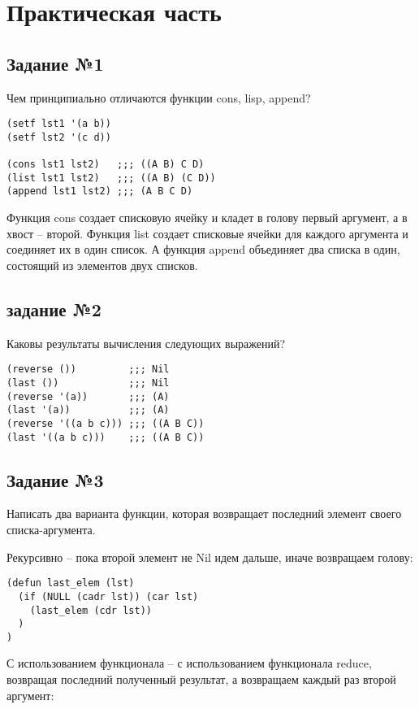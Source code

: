 \chapter{Практическая часть}

\section{Задание №1}

Чем принципиально отличаются функции cons, lisp, append?

\begin{lstlisting}
(setf lst1 '(a b))
(setf lst2 '(c d))

(cons lst1 lst2)   ;;; ((A B) C D)
(list lst1 lst2)   ;;; ((A B) (C D))
(append lst1 lst2) ;;; (A B C D)
\end{lstlisting}

Функция cons создает списковую ячейку и кладет в голову первый аргумент, а в хвост --
второй. Функция list создает списковые ячейки для каждого аргумента и соединяет
их в один список. А функция append объединяет два списка в один, состоящий из
элементов двух списков.

\section{задание №2}

Каковы результаты вычисления следующих выражений?

\begin{lstlisting}
(reverse ())         ;;; Nil
(last ())            ;;; Nil
(reverse '(a))       ;;; (A)
(last '(a))          ;;; (A)
(reverse '((a b c))) ;;; ((A B C))
(last '((a b c)))    ;;; ((A B C))
\end{lstlisting}

\section{Задание №3}

Написать два варианта функции, которая возвращает последний элемент своего
списка-аргумента.

Рекурсивно -- пока второй элемент не Nil идем дальше, иначе возвращаем голову:

\begin{lstlisting}
(defun last_elem (lst)
  (if (NULL (cadr lst)) (car lst)
    (last_elem (cdr lst))
  )
)
\end{lstlisting}

С использованием функционала -- с использованием функционала reduce, возвращая последний полученный результат, а возвращаем каждый раз второй аргумент:

